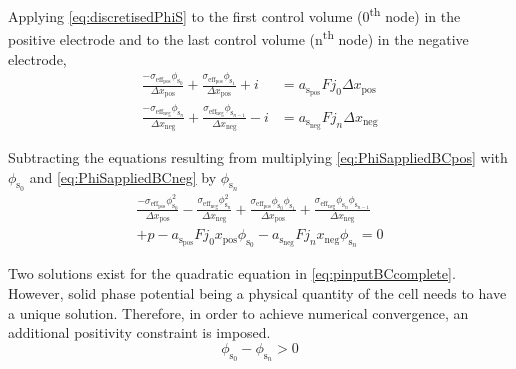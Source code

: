 Applying    \cref{eq:discretisedPhiS}    to    the    first    control    volume
(0\textsuperscript{th} node) in  the positive electrode and to  the last control
volume (n\textsuperscript{th} node) in the negative electrode,
\begin{align}
	\frac{-\sigma_{\text{eff}_\text{pos}} \phi_{\text{s}_0}}{\Delta x_\text{pos}} + \frac{\sigma_{\text{eff}_\text{pos}} \phi_{\text{s}_1}}{\Delta x_\text{pos}} + i &= a_{\text{s}_\text{pos}} F j_0 \Delta x_\text{pos}\label{eq:PhiSappliedBCpos}\\
	\frac{-\sigma_{\text{eff}_\text{neg}} \phi_{\text{s}_n}}{\Delta x_\text{neg}} + \frac{\sigma_{\text{eff}_\text{neg}} \phi_{\text{s}_{n-1}}}{\Delta x_\text{neg}} - i &= a_{\text{s}_\text{neg}} F j_n \Delta x_\text{neg}\label{eq:PhiSappliedBCneg}
\end{align}

Subtracting the equations  resulting from multiplying \cref{eq:PhiSappliedBCpos}
with $\phi_{\text{s}_0}$ and \cref{eq:PhiSappliedBCneg} by $\phi_{\text{s}_n}$
\begin{multline} \label{eq:pinputBCcomplete}
    \frac{-\sigma_{\text{eff}_\text{pos}} \phi^2_{\text{s}_0}}{\Delta x_\text{pos}} -
    \frac{\sigma_{\text{eff}_\text{neg}} \phi^2_{\text{s}_n}}{\Delta x_\text{neg}} +
    \frac{\sigma_{\text{eff}_\text{pos}} \phi_{\text{s}_0} \phi_{\text{s}_1}}{\Delta x_\text{pos}} +
    \frac{\sigma_{\text{eff}_\text{neg}} \phi_{\text{s}_n} \phi_{\text{s}_{n-1}}}{\Delta x_\text{neg}} \\+ p -
    a_{\text{s}_\text{pos}} F j_0 x_\text{pos} \phi_{\text{s}_0} - a_{\text{s}_\text{neg}} F j_n x_\text{neg}
    \phi_{\text{s}_n} = 0
\end{multline}


Two solutions  exist for  the quadratic equation  in \cref{eq:pinputBCcomplete}.
However, solid  phase potential being a  physical quantity of the  cell needs to
have a unique solution. Therefore, in order to achieve numerical convergence, an
additional positivity constraint is imposed.
\begin{equation}\label{eq:discpositivity}
	\phi_{\text{s}_0} - \phi_{\text{s}_n} > 0
\end{equation}

